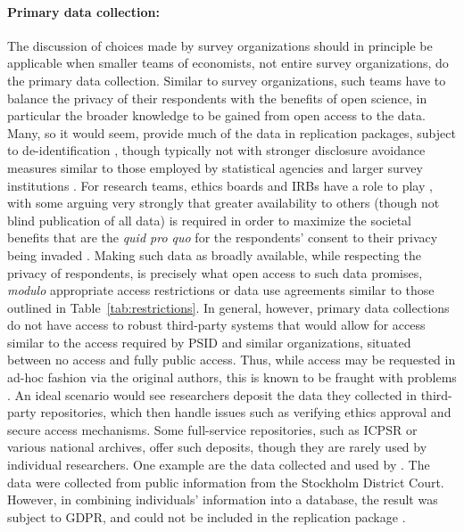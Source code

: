 \documentclass{article}
\begin{document}
\paragraph{Primary data collection:} The discussion of choices made by survey organizations should in principle be applicable when smaller teams of economists, not entire survey organizations, do the primary data collection. Similar to survey organizations, such teams have to balance the privacy of their respondents with the benefits of open science, in particular the broader knowledge to be gained from open access to the data. Many, so it would seem, provide much of the data in replication packages, subject  to de-identification \citep[see ][ for examples]{kopper_j-pal_2020,bjarkefur_development_2021}, though typically not with stronger disclosure avoidance measures similar to those employed by statistical agencies and larger survey institutions \citep[for a brief discussion of the issues and one possible solution, see ][]{mukherjee_assessing_2023}. For research teams, ethics boards and \acp{IRB} have a role to play \citep{grant_opinion_2019}, with some arguing very strongly that greater availability to others (though not blind publication of all data) is required in order to maximize the societal benefits that are the \textit{quid pro quo} for the respondents' consent to their privacy being invaded \citep{meyer_practical_2018,grant_opinion_2019}. Making such data as broadly available, while respecting the privacy of respondents, is precisely what open access to such data promises, \textit{modulo} appropriate access restrictions or data use agreements similar to those outlined in Table~\ref{tab:restrictions}. In general, however, primary data collections do not have access to robust third-party systems that would allow for access similar to the access required by PSID and similar organizations, situated between no access and fully public access. Thus, while access may be requested in ad-hoc fashion via the original authors, this is known to be fraught with problems \citep{watson_many_2022,gabelica_many_2022}. An ideal scenario would see researchers deposit the data they collected in third-party repositories, which then handle issues such as verifying ethics approval and secure access mechanisms. Some full-service repositories, such as \ac{ICPSR} or various national archives, offer such deposits, though they are rarely used by individual researchers. 
%
One example are the data collected and used by \citet{ahrsjo_identity_2024}. The data were collected from public information from the Stockholm District Court. However, in combining individuals' information into a database, the result was subject to \ac{GDPR}, and could not be included in the replication package \citep{ahrsjo_code_2024}. 
\end{document}
